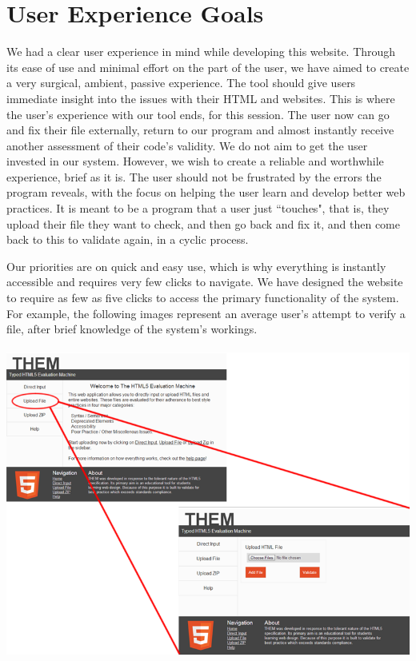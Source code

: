 \documentclass[10pt]{article}
\begin{document}
\newpage

\section*{User Experience Goals}

We had a clear user experience in mind while developing this website. Through its ease of use and minimal effort on the part of the user, we have aimed to create a very surgical, ambient, passive experience. The tool should give users immediate insight into the issues with their HTML and websites. This is where the user's experience with our tool ends, for this session. The user now can go and fix their file externally, return to our program and almost instantly receive another assessment of their code's validity. We do not aim to get the user invested in our system. However, we wish to create a reliable and worthwhile experience, brief as it is. The user should not be frustrated by the errors the program reveals, with the focus on helping the user learn and develop better web practices. It is meant to be a program that a user just ``touches", that is, they upload their file they want to check, and then go back and fix it, and then come back to this to validate again, in a cyclic process.

Our priorities are on quick and easy use, which is why everything is instantly accessible and requires very few clicks to navigate. We have designed the website to require as few as five clicks to access the primary functionality of the system. For example, the following images represent an average user's attempt to verify a file, after brief knowledge of the system's workings. \\ \\

\includegraphics[scale=0.4]{click1.png}
\end{document}
